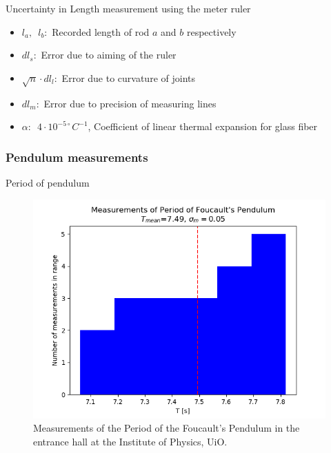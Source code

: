 \documentclass[11pt,a4paper]{article}
\begin{document}
  \begin{table}[H]
    \center
    \caption{Uncertainty in Length measurement using the meter ruler}
    \label{tab:uncert}
    
  \end{table}
  
  \begin{itemize}
    \item $l_a, \enspace l_b:$ Recorded length of rod $a$ and $b$ respectively
    \item $dl_s:$ Error due to aiming of the ruler
    \item $\sqrt n \cdot dl_l:$ Error due to curvature of joints
    \item $dl_m:$ Error due to precision of measuring lines
    \item $\alpha :\enspace 4\cdot10^{-5\circ} C^{-1}$, Coefficient of linear thermal expansion for glass fiber
  \end{itemize}

  \subsubsection{Pendulum measurements}
  \begin{table}[H]
    \center
    \caption{Period of pendulum}
    \label{tab:pendel}
    
  \end{table}
  \begin{figure}[H]
    \center
    \includegraphics[scale=0.7]{scripts/figs/period.png}
    \caption{Measurements of the Period of the Foucault's Pendulum in the entrance hall at the Institute of Physics, UiO.}
    \label{fig:pendel}
  \end{figure}
\end{document}
